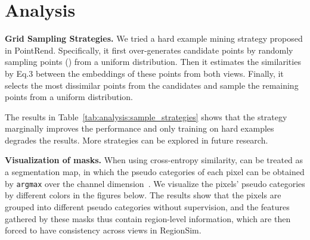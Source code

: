 \documentclass[runningheads]{llncs}
\newcommand{\myparagraph}[1]{{\noindent\bf #1}}
\begin{document}
\section{Analysis}

\myparagraph{Grid Sampling Strategies.}
We tried a hard example mining strategy proposed in PointRend.
Specifically, it first over-generates candidate points by randomly sampling  points () from a uniform distribution.
Then it estimates the similarities by Eq.3 between the embeddings of these points from both views.
Finally, it selects the most dissimilar  points from the  candidates and
sample the remaining  points from a uniform distribution.

The results in Table~\ref{tab:analysis:sample_strategies} shows that the strategy marginally improves the performance
and only training on hard examples degrades the results.
More strategies can be explored in future research.

\myparagraph{Visualization of masks.}
When using cross-entropy similarity,  can be treated as a segmentation map,
in which the pseudo categories of each pixel can be obtained by \texttt{argmax} over the channel dimension~\cite{simsiam}.
We visualize the pixels' pseudo categories by different colors in the figures below.
The results show that the pixels are grouped into different pseudo categories without supervision,
and the features gathered by these masks thus contain region-level information,
which are then forced to have consistency across views in RegionSim.
 
\clearpage


\end{document}
